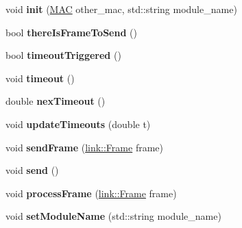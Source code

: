 \begin{DoxyCompactItemize}
\item 
void {\bfseries init} (\hyperlink{structMAC}{M\+AC} other\+\_\+mac, std\+::string module\+\_\+name)\hypertarget{classswp__protocol_ac75ad403a0e67ee52f55845a5649daf8}{}\label{classswp__protocol_ac75ad403a0e67ee52f55845a5649daf8}

\item 
bool {\bfseries there\+Is\+Frame\+To\+Send} ()\hypertarget{classswp__protocol_a573d06b53b641a8f9354956e1aae8d42}{}\label{classswp__protocol_a573d06b53b641a8f9354956e1aae8d42}

\item 
bool {\bfseries timeout\+Triggered} ()\hypertarget{classswp__protocol_ae5bb244e5dd8eb44cd2550ca270ee80b}{}\label{classswp__protocol_ae5bb244e5dd8eb44cd2550ca270ee80b}

\item 
void {\bfseries timeout} ()\hypertarget{classswp__protocol_af7e9869bf57452799f53effa6cb02ddd}{}\label{classswp__protocol_af7e9869bf57452799f53effa6cb02ddd}

\item 
double {\bfseries nex\+Timeout} ()\hypertarget{classswp__protocol_ae9dca95b848d2c6c3c2f429152ae0929}{}\label{classswp__protocol_ae9dca95b848d2c6c3c2f429152ae0929}

\item 
void {\bfseries update\+Timeouts} (double t)\hypertarget{classswp__protocol_abe07df0326dbf0b8d5c1a59b1e4f6dc7}{}\label{classswp__protocol_abe07df0326dbf0b8d5c1a59b1e4f6dc7}

\item 
void {\bfseries send\+Frame} (\hyperlink{structlink_1_1Frame}{link\+::\+Frame} frame)\hypertarget{classswp__protocol_a6d5c49fbcaf4d540ee065b862df339ae}{}\label{classswp__protocol_a6d5c49fbcaf4d540ee065b862df339ae}

\item 
void {\bfseries send} ()\hypertarget{classswp__protocol_a25a7db2cad83583871ae98437b360847}{}\label{classswp__protocol_a25a7db2cad83583871ae98437b360847}

\item 
void {\bfseries process\+Frame} (\hyperlink{structlink_1_1Frame}{link\+::\+Frame} frame)\hypertarget{classswp__protocol_a37f388591cdea5b3cac8a7bf3a829e2b}{}\label{classswp__protocol_a37f388591cdea5b3cac8a7bf3a829e2b}

\item 
void {\bfseries set\+Module\+Name} (std\+::string module\+\_\+name)\hypertarget{classswp__protocol_aad7851e8e2708a8e23eaf1a6fa8637c8}{}\label{classswp__protocol_aad7851e8e2708a8e23eaf1a6fa8637c8}

\end{DoxyCompactItemize}

